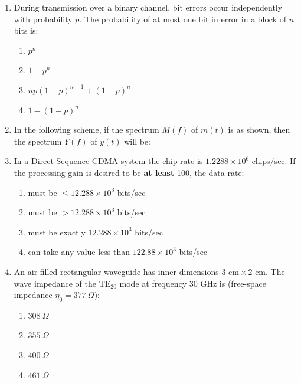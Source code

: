 \documentclass[journal,12pt,onecolumn]{IEEEtran}
\theoremstyle{remark}
\begin{document}
\begin{enumerate}
\item During transmission over a binary channel, bit errors occur independently with probability $p$. The probability of {at most one} bit in error in a block of $n$ bits is: 
\hfill{}
\begin{multicols}{2}
    

\begin{enumerate}
    \item $p^n$
    \item $1-p^n$
    \item $np(1-p)^{n-1} + (1-p)^n$
    \item $1-(1-p)^n$
\end{enumerate}
\end{multicols}
\item In the following scheme, if the spectrum $M(f)$ of $m(t)$ is as shown, then the spectrum $Y(f)$ of $y(t)$ will be: 
\hfill{}

\item In a Direct Sequence CDMA system the chip rate is $1.2288\times10^6$ chips/sec. If the processing gain is desired to be \textbf{at least} 100, the data rate:
\hfill{}

\begin{enumerate}
  \item must be $\le 12.288\times10^3$ bits/sec
  \item must be $>12.288\times10^3$ bits/sec
  \item must be exactly $12.288\times10^3$ bits/sec
  \item can take any value less than $122.88\times10^3$ bits/sec
\end{enumerate}

\item An air-filled rectangular waveguide has inner dimensions $3\text{ cm}\times2\text{ cm}$. The wave impedance of the TE$_{20}$ mode at frequency 30 GHz is (free-space impedance $\eta_0=377~\Omega$): 
\hfill{}

\begin{multicols}{4}
\begin{enumerate}
  \item $308~\Omega$
  \item $355~\Omega$
  \item $400~\Omega$
  \item $461~\Omega$
\end{enumerate}
\end{multicols}


\end{enumerate}
\end{document}
